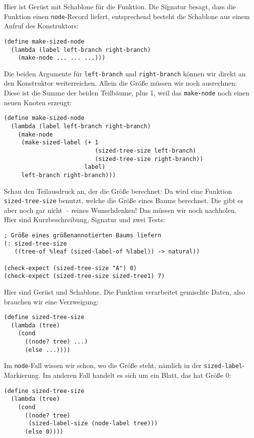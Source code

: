 %
Hier ist Gerüst mit Schablone für die Funktion. Die Signatur besagt,
dass die Funktion einen  \lstinline{node}-Record liefert, entsprechend
besteht die Schablone aus einem Aufruf des Konstruktors:
%
\begin{lstlisting}
(define make-sized-node
  (lambda (label left-branch right-branch)
    (make-node ... ... ...)))
\end{lstlisting}
%
Die beiden Argumente für \lstinline{left-branch} und
\lstinline{right-branch} können wir direkt an den Konstruktor
weiterreichen.  Allein die Größe müssen wir noch ausrechnen: Diese ist
die Summe der beiden Teilbäume, plus 1, weil das \lstinline{make-node}
noch einen neuen Knoten erzeugt:
%
\begin{lstlisting}
(define make-sized-node
  (lambda (label left-branch right-branch)
    (make-node
     (make-sized-label (+ 1
                          (sized-tree-size left-branch)
                          (sized-tree-size right-branch))
                       label)
     left-branch right-branch)))
\end{lstlisting}
%
Schau den Teilausdruck an, der die Größe berechnet: Da wird
eine Funktion \lstinline{sized-tree-size} benutzt, welche die Größe
eines Baums berechnet.  Die gibt es aber noch gar nicht~-- reines
Wunschdenken!  Das müssen wir noch nachholen.  Hier sind
Kurzbeschreibung, Signatur und zwei Tests:
%
\begin{lstlisting}
; Größe eines größenannotierten Baums liefern
(: sized-tree-size
   ((tree-of %leaf (sized-label-of %label)) -> natural))

(check-expect (sized-tree-size "A") 0)
(check-expect (sized-tree-size sized-tree1) 7)
\end{lstlisting}
%
Hier sind Gerüst und Schablone.  Die Funktion verarbeitet gemischte
Daten, also brauchen wir eine Verzweigung:
%
\begin{lstlisting}
(define sized-tree-size
  (lambda (tree)
    (cond
      ((node? tree) ...)
      (else ...))))
\end{lstlisting}
%
Im \lstinline{node}-Fall wissen wir schon, wo die Größe steht, nämlich
in der \lstinline{sized-label}-Markierung.  Im anderen Fall handelt es
sich um ein Blatt, das hat Größe $0$:
%
\begin{lstlisting}
(define sized-tree-size
  (lambda (tree)
    (cond
      ((node? tree)
       (sized-label-size (node-label tree)))
      (else 0))))
\end{lstlisting}
%
